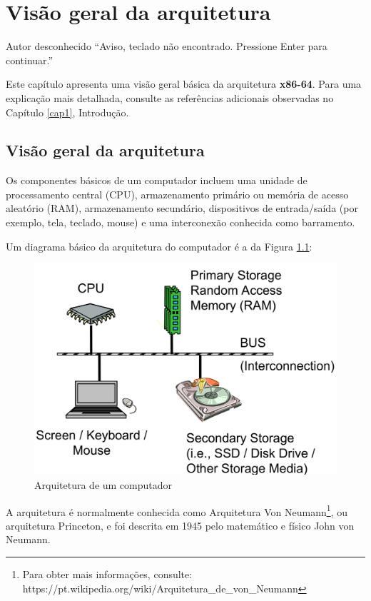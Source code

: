 \chapter{Visão geral da arquitetura}

\begin{chapquote}{Autor desconhecido}
``Aviso, teclado não encontrado. Pressione Enter para continuar.''
\end{chapquote}

Este capítulo apresenta uma visão geral básica da arquitetura \textbf{x86-64}. Para uma explicação mais detalhada, consulte as referências adicionais observadas no Capítulo \ref{cap1}, Introdução.

\section{Visão geral da arquitetura}
Os componentes básicos de um computador incluem uma unidade de processamento central (CPU), armazenamento primário ou memória de acesso aleatório (RAM), armazenamento secundário, dispositivos de entrada/saída (por exemplo, tela, teclado, mouse) e uma interconexão conhecida como barramento.

Um diagrama básico da arquitetura do computador é a da Figura \ref{arquiteturacomputador}:
\begin{figure}[ht]
	\includegraphics[width=\linewidth]{imagens/arquitetura}
	\caption{Arquitetura de um computador}
	\label{arquiteturacomputador}
\end{figure}

A arquitetura é normalmente conhecida como Arquitetura Von Neumann\footnote{Para obter mais informações, consulte: https://pt.wikipedia.org/wiki/Arquitetura\_de\_von\_Neumann}, ou arquitetura Princeton, e foi descrita em 1945 pelo matemático e físico John von Neumann.

